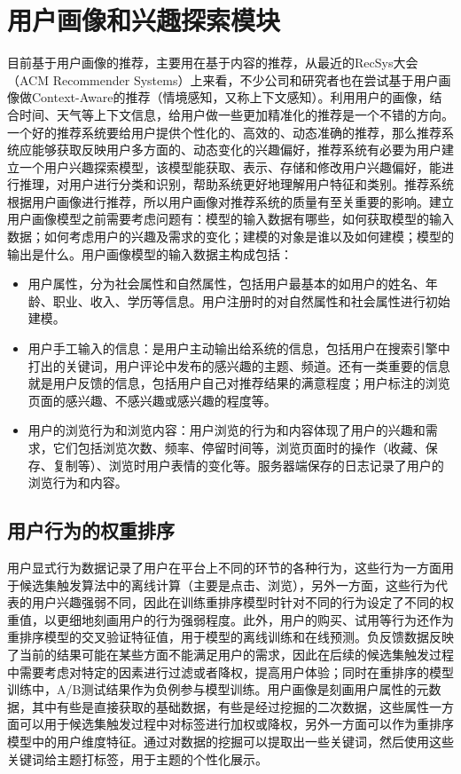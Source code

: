   \section{用户画像和兴趣探索模块}
  目前基于用户画像的推荐，主要用在基于内容的推荐，从最近的RecSys大会（ACM Recommender Systems）上来看，不少公司和研究者也在尝试基于用户画像做Context-Aware的推荐（情境感知，又称上下文感知）。利用用户的画像，结合时间、天气等上下文信息，给用户做一些更加精准化的推荐是一个不错的方向。一个好的推荐系统要给用户提供个性化的、高效的、动态准确的推荐，那么推荐系统应能够获取反映用户多方面的、动态变化的兴趣偏好，推荐系统有必要为用户建立一个用户兴趣探索模型，该模型能获取、表示、存储和修改用户兴趣偏好，能进行推理，对用户进行分类和识别，帮助系统更好地理解用户特征和类别。推荐系统根据用户画像进行推荐，所以用户画像对推荐系统的质量有至关重要的影响。建立用户画像模型之前需要考虑问题有：模型的输入数据有哪些，如何获取模型的输入数据；如何考虑用户的兴趣及需求的变化；建模的对象是谁以及如何建模；模型的输出是什么。用户画像模型的输入数据主构成包括：
  \begin{itemize}
  \item 用户属性，分为社会属性和自然属性，包括用户最基本的如用户的姓名、年龄、职业、收入、学历等信息。用户注册时的对自然属性和社会属性进行初始建模。 
  \item 用户手工输入的信息：是用户主动输出给系统的信息，包括用户在搜索引擎中打出的关键词，用户评论中发布的感兴趣的主题、频道。还有一类重要的信息就是用户反馈的信息，包括用户自己对推荐结果的满意程度；用户标注的浏览页面的感兴趣、不感兴趣或感兴趣的程度等。
  \item 用户的浏览行为和浏览内容：用户浏览的行为和内容体现了用户的兴趣和需求，它们包括浏览次数、频率、停留时间等，浏览页面时的操作（收藏、保存、复制等）、浏览时用户表情的变化等。服务器端保存的日志记录了用户的浏览行为和内容。
  \end{itemize}

  \subsection{用户行为的权重排序}
  用户显式行为数据记录了用户在平台上不同的环节的各种行为，这些行为一方面用于候选集触发算法中的离线计算（主要是点击、浏览），另外一方面，这些行为代表的用户兴趣强弱不同，因此在训练重排序模型时针对不同的行为设定了不同的权重值，以更细地刻画用户的行为强弱程度。此外，用户的购买、试用等行为还作为重排序模型的交叉验证特征值，用于模型的离线训练和在线预测。负反馈数据反映了当前的结果可能在某些方面不能满足用户的需求，因此在后续的候选集触发过程中需要考虑对特定的因素进行过滤或者降权，提高用户体验；同时在重排序的模型训练中，A/B测试结果作为负例参与模型训练。用户画像是刻画用户属性的元数据，其中有些是直接获取的基础数据，有些是经过挖掘的二次数据，这些属性一方面可以用于候选集触发过程中对标签进行加权或降权，另外一方面可以作为重排序模型中的用户维度特征。通过对数据的挖掘可以提取出一些关键词，然后使用这些关键词给主题打标签，用于主题的个性化展示。

